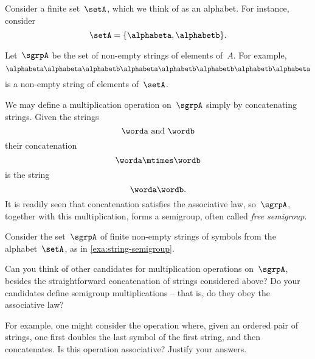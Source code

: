 \begin{example}
    \label{string-sgrp}
    \label{exa:string-semigroup}
    Consider a finite set~$\setA$, which we think of as an alphabet. For instance, consider
    \begin{equation}
        \label{eq:string-semigroup-alphabet}
        \setA = \{ \alphabeta, \alphabetb \}.
    \end{equation}
    
    Let~$\sgrpA$ be the set of non-empty strings of elements of~$A$. For example,
    \begin{equation}
        \label{eq:string-semigroup-word}
        \alphabeta\alphabeta \alphabetb \alphabeta \alphabetb \alphabetb \alphabetb \alphabeta
    \end{equation}
    is a non-empty string of elements of~$\setA$.
    
    We may define a multiplication operation on~$\sgrpA$ simply by concatenating strings. Given the strings
    \begin{equation*}
        \worda \text{ and } \wordb
    \end{equation*}
    their concatenation
    \begin{equation*}
        \label{eq:string-semigroup-wordab}
        \worda \mtimes  \wordb
    \end{equation*}
    is the string
    \begin{equation*}
        \label{eq:string-semigroup-wordab-concat}
        \worda \wordb.
    \end{equation*}
    It is readily seen that concatenation satisfies the associative law, so~$\sgrpA$, together with this multiplication, forms a semigroup, often called \emph{free semigroup}.
\end{example}
\showslides{
    \begin{forslides}
        \begin{equation}
            \label{eq:string-semigroup-empty-string}
            \alphabeta\alphabeta \alphabetb \mtimes \tup{} =  \alphabeta\alphabeta \alphabetb
        \end{equation}
    \end{forslides}
}


\begin{gradedexercise}
    \label{ex:VariationsOnConcatenation}
    \label{ex:alphabet}
    Consider the set~$\sgrpA$ of finite non-empty strings of symbols from the alphabet~$\setA$, as in \cref{exa:string-semigroup}.
    
    
    Can you think of other candidates for multiplication operations on~$\sgrpA$, besides the straightforward concatenation of strings considered above?
    Do your candidates define semigroup multiplications -- that is, do they obey the associative law?
    
    
    For example, one might consider the operation where, given an ordered pair of strings, one first doubles the last symbol of the first string, and then concatenates.
    Is this operation associative? Justify your answers.
\end{gradedexercise}




